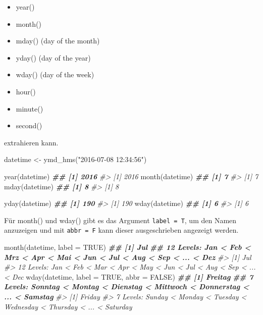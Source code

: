 \documentclass[
]{article}
\newenvironment{Shaded}{\begin{snugshade}}{\end{snugshade}}
\newcommand{\AttributeTok}[1]{\textcolor[rgb]{0.77,0.63,0.00}{#1}}
\newcommand{\CommentTok}[1]{\textcolor[rgb]{0.56,0.35,0.01}{\textit{#1}}}
\newcommand{\ConstantTok}[1]{\textcolor[rgb]{0.00,0.00,0.00}{#1}}
\newcommand{\DocumentationTok}[1]{\textcolor[rgb]{0.56,0.35,0.01}{\textbf{\textit{#1}}}}
\newcommand{\FunctionTok}[1]{\textcolor[rgb]{0.00,0.00,0.00}{#1}}
\newcommand{\NormalTok}[1]{#1}
\newcommand{\OtherTok}[1]{\textcolor[rgb]{0.56,0.35,0.01}{#1}}
\newcommand{\StringTok}[1]{\textcolor[rgb]{0.31,0.60,0.02}{#1}}
\providecommand{\tightlist}{%
  \setlength{\itemsep}{0pt}\setlength{\parskip}{0pt}}
\begin{document}
\begin{itemize}
\tightlist
\item
  year()
\item
  month()
\item
  mday() (day of the month)
\item
  yday() (day of the year)
\item
  wday() (day of the week)
\item
  hour()
\item
  minute()
\item
  second()
\end{itemize}

extrahieren kann.

\begin{Shaded}
\begin{Highlighting}[]
\NormalTok{datetime }\OtherTok{\textless{}{-}} \FunctionTok{ymd\_hms}\NormalTok{(}\StringTok{"2016{-}07{-}08 12:34:56"}\NormalTok{)}

\FunctionTok{year}\NormalTok{(datetime)}
\DocumentationTok{\#\# [1] 2016}
\CommentTok{\#\textgreater{} [1] 2016}
\FunctionTok{month}\NormalTok{(datetime)}
\DocumentationTok{\#\# [1] 7}
\CommentTok{\#\textgreater{} [1] 7}
\FunctionTok{mday}\NormalTok{(datetime)}
\DocumentationTok{\#\# [1] 8}
\CommentTok{\#\textgreater{} [1] 8}

\FunctionTok{yday}\NormalTok{(datetime)}
\DocumentationTok{\#\# [1] 190}
\CommentTok{\#\textgreater{} [1] 190}
\FunctionTok{wday}\NormalTok{(datetime)}
\DocumentationTok{\#\# [1] 6}
\CommentTok{\#\textgreater{} [1] 6}
\end{Highlighting}
\end{Shaded}

Für month() und wday() gibt es das Argument \texttt{label\ =\ T}, um den Namen anzuzeigen und mit \texttt{abbr\ =\ F} kann dieser ausgeschrieben angezeigt werden.

\begin{Shaded}
\begin{Highlighting}[]
\FunctionTok{month}\NormalTok{(datetime, }\AttributeTok{label =} \ConstantTok{TRUE}\NormalTok{)}
\DocumentationTok{\#\# [1] Jul}
\DocumentationTok{\#\# 12 Levels: Jan \textless{} Feb \textless{} Mrz \textless{} Apr \textless{} Mai \textless{} Jun \textless{} Jul \textless{} Aug \textless{} Sep \textless{} ... \textless{} Dez}
\CommentTok{\#\textgreater{} [1] Jul}
\CommentTok{\#\textgreater{} 12 Levels: Jan \textless{} Feb \textless{} Mar \textless{} Apr \textless{} May \textless{} Jun \textless{} Jul \textless{} Aug \textless{} Sep \textless{} ... \textless{} Dec}
\FunctionTok{wday}\NormalTok{(datetime, }\AttributeTok{label =} \ConstantTok{TRUE}\NormalTok{, }\AttributeTok{abbr =} \ConstantTok{FALSE}\NormalTok{)}
\DocumentationTok{\#\# [1] Freitag}
\DocumentationTok{\#\# 7 Levels: Sonntag \textless{} Montag \textless{} Dienstag \textless{} Mittwoch \textless{} Donnerstag \textless{} ... \textless{} Samstag}
\CommentTok{\#\textgreater{} [1] Friday}
\CommentTok{\#\textgreater{} 7 Levels: Sunday \textless{} Monday \textless{} Tuesday \textless{} Wednesday \textless{} Thursday \textless{} ... \textless{} Saturday}
\end{Highlighting}
\end{Shaded}
\end{document}
